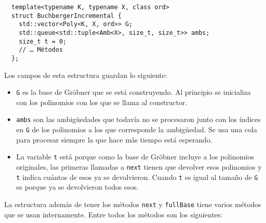 \documentclass[12pt]{report}
\theoremstyle{customstyle}
\theoremstyle{factstyle}
\begin{document}
\begin{verbatim}
  template<typename K, typename X, class ord>
  struct BuchbergerIncremental {
    std::vector<Poly<K, X, ord>> G;
    std::queue<std::tuple<Amb<X>, size_t, size_t>> ambs;
    size_t t = 0;
    // … Métodos
  };
\end{verbatim}

Los campos de esta estructura guardan lo siguiente:

\begin{itemize}
  \item \texttt{G} es la base de Gröbner que se está construyendo. Al principio se inicializa con los polinomios con los que se llama al constructor.
  \item \texttt{ambs} son las ambigüedades que todavía no se procesaron junto con los índices en \texttt{G} de los polinomios a los que corresponde la ambigüedad. Se usa una cola para procesar siempre la que hace más tiempo está esperando.
  \item La variable \texttt{t} está porque como la base de Gröbner incluye a los polinomios originales, las primeras llamadas a \texttt{next} tienen que devolver esos polinomios y \texttt{t} indica cuántos de esos ya se devolvieron. Cuando \texttt{t} es igual al tamaño de \texttt{G} es porque ya se devolvieron todos esos.
\end{itemize}

La estructura además de tener los métodos \texttt{next} y \texttt{fullBase} tiene varios métodos que se usan internamente. Entre todos los métodos son los siguientes: %
\end{document}
